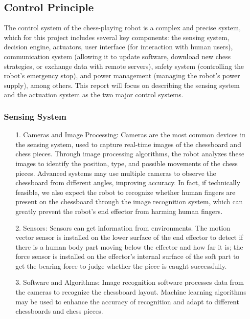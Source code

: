 \documentclass[10pt, a4paper, twocolumn]{article}
\begin{document}
\subsection{Control Principle}
The control system of the chess-playing robot is a complex and precise system, which for this project includes several key components: the sensing system, decision engine, actuators, user interface (for interaction with human users), communication system (allowing it to update software, download new chess strategies, or exchange data with remote servers), safety system (controlling the robot's emergency stop), and power management (managing the robot's power supply), among others. This report will focus on describing the sensing system and the actuation system as the two major control systems.

\subsubsection{Sensing System}

\begin{itemize}
    \item [1.] Cameras and Image Processing: Cameras are the most common devices in the sensing system, used to capture real-time images of the chessboard and chess pieces. Through image processing algorithms, the robot analyzes these images to identify the position, type, and possible movements of the chess pieces. Advanced systems may use multiple cameras to observe the chessboard from different angles, improving accuracy. In fact, if technically feasible, we also expect the robot to recognize whether human fingers are present on the chessboard through the image recognition system, which can greatly prevent the robot's end effector from harming human fingers.
    \item [2.] Sensors: Sensors can get information from environments. The motion vector sensor is installed on the lower surface of the end effector to detect if there is a human body part moving below the effector and how far it is; the force sensor is installed on the effector’s internal surface of the soft part to get the bearing force to judge whether the piece is caught successfully.
    \item [3.] Software and Algorithms: Image recognition software processes data from the cameras to recognize the chessboard layout. Machine learning algorithms may be used to enhance the accuracy of recognition and adapt to different chessboards and chess pieces.
\end{itemize}
\end{document}

